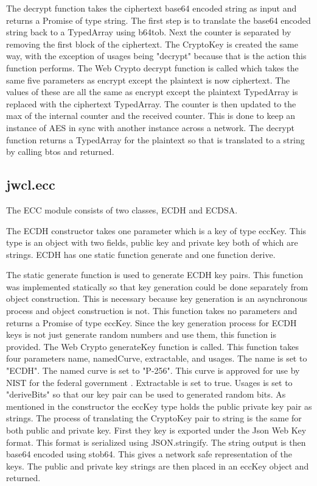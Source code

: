The decrypt function takes the ciphertext base64 encoded string as input and returns a Promise of type string. The first step is to translate the base64 encoded string back to a TypedArray using b64tob. Next the counter is separated by removing the first block of the ciphertext. The CryptoKey is created the same way, with the exception of usages being "decrypt" because that is the action this function performs. The Web Crypto decrypt function is called which takes the same five parameters as encrypt except the plaintext is now ciphertext. The values of these are all the same as encrypt except the plaintext TypedArray is replaced with the ciphertext TypedArray. The counter is then updated to the max of the internal counter and the received counter. This is done to keep an instance of AES in sync with another instance across a network. The decrypt function returns a TypedArray for the plaintext so that is translated to a string by calling btos and returned.


\subsection{jwcl.ecc}


The ECC module consists of two classes, ECDH and ECDSA. 


The ECDH constructor takes one parameter which is a key of type eccKey. This type is an object with two fields, public key and private key both of which are strings. ECDH has one static function generate and one function derive. 


The static generate function is used to generate ECDH key pairs. This function was implemented statically so that key generation could be done separately from object construction. This is necessary because key generation is an asynchronous process and object construction is not. This function takes no parameters and returns a Promise of type eccKey. Since the key generation process for ECDH keys is not just generate random numbers and use them, this function is provided. The Web Crypto generateKey function is called. This function takes four parameters name, namedCurve, extractable, and usages. The name is set to "ECDH". The named curve is set to "P-256". This curve is approved for use by NIST for the federal government \cite{nist-curves}.
Extractable is set to true. Usages is set to "deriveBits" so that our key pair can be used to generated random bits. As mentioned in the constructor the eccKey type holds the public private key pair as strings. The process of translating the CryptoKey pair to string is the same for both public and private key. First they key is exported under the Json Web Key format. This format is serialized using JSON.stringify. The string output is then base64 encoded using stob64. This gives a network safe representation of the keys. The public and private key strings are then placed in an eccKey object and returned.


